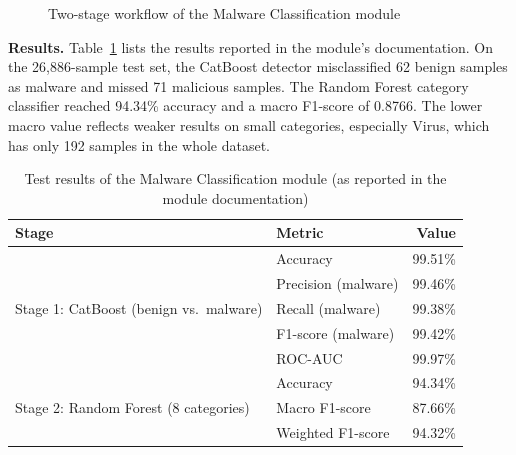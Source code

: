 \begin{figure}[H]
\centering
{}
\caption{Two-stage workflow of the Malware Classification module}
\label{fig:mw-flow}
\end{figure}

\textbf{Results.} Table~\ref{tab:mw-results} lists the results reported in the module's documentation. On the 26,886-sample test set, the CatBoost detector misclassified 62 benign samples as malware and missed 71 malicious samples. The Random Forest category classifier reached 94.34\% accuracy and a macro F1-score of 0.8766. The lower macro value reflects weaker results on small categories, especially Virus, which has only 192 samples in the whole dataset.

\begin{table}[H]
\centering
\caption{Test results of the Malware Classification module (as reported in the module documentation)}
\label{tab:mw-results}
\small
\begin{tabular}{llr}
\toprule
\textbf{Stage} & \textbf{Metric} & \textbf{Value} \\
\midrule
\multirow{5}{*}{Stage 1: CatBoost (benign vs.\ malware)}
 & Accuracy              & 99.51\% \\
 & Precision (malware)   & 99.46\% \\
 & Recall (malware)      & 99.38\% \\
 & F1-score (malware)    & 99.42\% \\
 & ROC-AUC               & 99.97\% \\
\midrule
\multirow{3}{*}{Stage 2: Random Forest (8 categories)}
 & Accuracy              & 94.34\% \\
 & Macro F1-score        & 87.66\% \\
 & Weighted F1-score     & 94.32\% \\
\bottomrule
\end{tabular}
\end{table}

